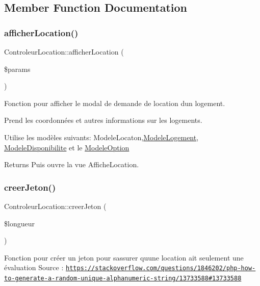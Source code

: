 \subsection{Member Function Documentation}
\mbox{\label{class_controleur_location_a4b6693239049c3db80013b8110687690}} 
\subsubsection{\texorpdfstring{afficher\+Location()}{afficherLocation()}}
{\footnotesize\ttfamily Controleur\+Location\+::afficher\+Location (\begin{DoxyParamCaption}\item[{}]{\$params }\end{DoxyParamCaption})}



Fonction pour afficher le modal de demande de location d\textquotesingle{}un logement. 

Prend les coordonnées et autres informations sur les logements.

Utilise les modèles suivants\+: Modele\+Locaton,\hyperlink{class_modele_logement}{Modele\+Logement}, \hyperlink{class_modele_disponibilite}{Modele\+Disponibilite} et le \hyperlink{class_modele_option}{Modele\+Option} \begin{DoxyReturn}{Returns}
Puis ouvre la vue Affiche\+Location. 
\end{DoxyReturn}
\mbox{\label{class_controleur_location_aa9739669efbe3d84d514eb7b27a78a18}} 
\subsubsection{\texorpdfstring{creer\+Jeton()}{creerJeton()}}
{\footnotesize\ttfamily Controleur\+Location\+::creer\+Jeton (\begin{DoxyParamCaption}\item[{}]{\$longueur }\end{DoxyParamCaption})}

Fonction pour créer un jeton pour s\textquotesingle{}assurer qu\textquotesingle{}une location ait seulement une évaluation Source \+: \href{https://stackoverflow.com/questions/1846202/php-how-to-generate-a-random-unique-alphanumeric-string/13733588#13733588}{\tt https\+://stackoverflow.\+com/questions/1846202/php-\/how-\/to-\/generate-\/a-\/random-\/unique-\/alphanumeric-\/string/13733588\#13733588} \mbox{\label{class_controleur_location_a0db233aa6c62ab2d26496d64aa0b450c}} 
